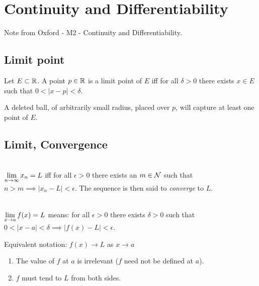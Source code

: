 \newpage

\section{Continuity and Differentiability}
Note from Oxford - M2 - Continuity and Differentiability.

\subsection{Limit point}
\begin{definition*}
Let $E \subset \R$. A point $p \in \R$ is a limit point of $E$ iff for all $\delta > 0$ there
exists $x \in E$ such that $0 < |x - p| < \delta$.
\end{definition*}
\begin{intuition*}
  A deleted ball, of arbitrarily small radius, placed over $p$, will capture at least one point of
  $E$.
\end{intuition*}

\subsection{Limit, Convergence}

\begin{definition*}~\\
$\LimEq{x_n}{L}{n}{\infty}$ iff for all $\epsilon > 0$ there exists an $m \in \N$ such that
$n > m \implies |x_n - L| < \epsilon$. The sequence is then said to \textit{converge} to $L$.
\end{definition*}

\begin{definition*}~\\
$\LimEq{f(x)}{L}{x}{a}$ means: for all $\epsilon > 0$ there exists $\delta > 0$ such that
$0 < |x - a| < \delta \implies |f(x) - L| < \epsilon$.
\end{definition*}

Equivalent notation: $f(x) \to L$ as $x \to a$

\begin{remark*}\hspace{0pt}
  \begin{enumerate}
  \item The value of $f$ at $a$ is irrelevant ($f$ need not be defined at $a$).
  \item $f$ must tend to $L$ from both sides.
  \end{enumerate}
\end{remark*}

